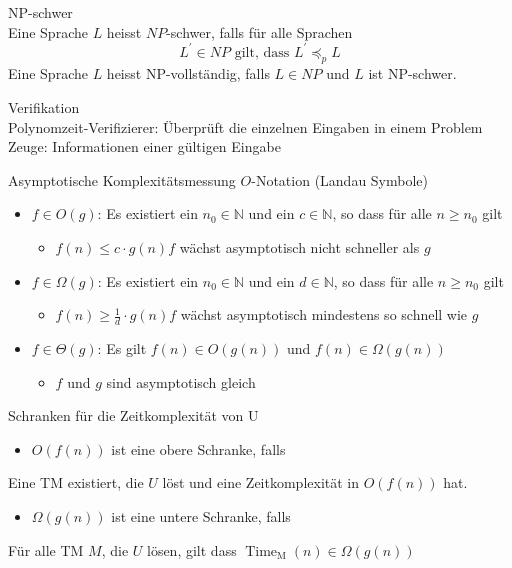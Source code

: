 \begin{concept}{NP-schwer}\\
    Eine Sprache $L$ heisst $N P$-schwer, falls für alle Sprachen
    $$
    L^{\prime} \in N P \text { gilt, dass } L^{\prime} \preccurlyeq_{p} L
    $$
    Eine Sprache $L$ heisst NP-vollständig, falls $L \in N P$ und $L$ ist NP-schwer.
\end{concept}

\begin{definition}{Verifikation}\\
    Polynomzeit-Verifizierer: Überprüft die einzelnen Eingaben in einem Problem\\
    Zeuge: Informationen einer gültigen Eingabe
\end{definition}

\begin{KR}{Asymptotische Komplexitätsmessung}
    $O$-Notation (Landau Symbole)
    \begin{itemize}
        \item $f \in O(g)$: Es existiert ein $n_{0} \in \mathbb{N}$ und ein $c \in \mathbb{N}$, so dass für alle $n \geq n_{0}$ gilt
        \begin{itemize}
            \item $f(n) \leq c \cdot g(n) f$ wächst asymptotisch nicht schneller als $g$
        \end{itemize}
        \item $f \in \Omega(g)$: Es existiert ein $n_{0} \in \mathbb{N}$ und ein $d \in \mathbb{N}$, so dass für alle $n \geq n_{0}$ gilt
        \begin{itemize}
            \item $f(n) \geq \frac{1}{d} \cdot g(n) f$ wächst asymptotisch mindestens so schnell wie $g$
        \end{itemize}
        \item $f \in \Theta(g)$: Es gilt $f(n) \in O(g(n))$ und $f(n) \in \Omega(g(n))$
        \begin{itemize}
            \item $f$ und $g$ sind asymptotisch gleich
        \end{itemize}
    \end{itemize}
\end{KR}

\begin{concept}{Schranken für die Zeitkomplexität von U}
    \begin{itemize}
    \item $O(f(n))$ ist eine obere Schranke, falls
    \end{itemize}

    Eine TM existiert, die $U$ löst und eine Zeitkomplexität in $O(f(n))$ hat.

    \begin{itemize}
    \item $\Omega(g(n))$ ist eine untere Schranke, falls
    \end{itemize}

    Für alle TM $M$, die $U$ lösen, gilt dass $\operatorname{Time}_{\mathrm{M}}(n) \in \Omega(g(n))$
\end{concept}

